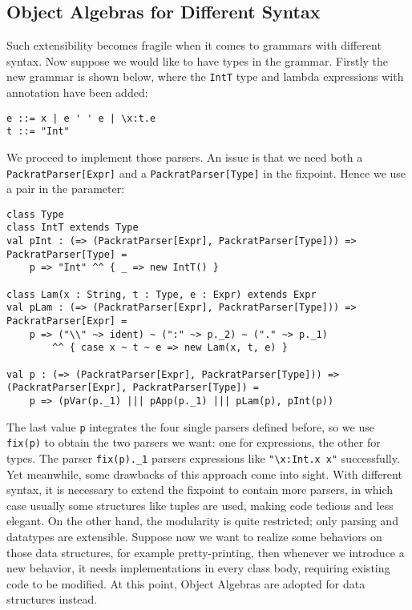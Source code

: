 \subsection{Object Algebras for Different Syntax}\label{subsec:differentsyntax}

Such extensibility becomes fragile when it comes to grammars with different syntax. Now suppose we would like to have types in the grammar. Firstly the new grammar is shown below, where the \lstinline{IntT} type and lambda expressions with annotation have been added:
\begin{lstlisting}
e ::= x | e ' ' e | \x:t.e
t ::= "Int"
\end{lstlisting}

We proceed to implement those parsers. An issue is that we need both a \lstinline{PackratParser[Expr]} and a \lstinline{PackratParser[Type]} in the fixpoint.
Hence we use a pair in the parameter:
\begin{lstlisting}
class Type
class IntT extends Type
val pInt : (=> (PackratParser[Expr], PackratParser[Type])) => PackratParser[Type] =
    p => "Int" ^^ { _ => new IntT() }

class Lam(x : String, t : Type, e : Expr) extends Expr
val pLam : (=> (PackratParser[Expr], PackratParser[Type])) => PackratParser[Expr] =
    p => ("\\" ~> ident) ~ (":" ~> p._2) ~ ("." ~> p._1)
        ^^ { case x ~ t ~ e => new Lam(x, t, e) }

val p : (=> (PackratParser[Expr], PackratParser[Type])) => (PackratParser[Expr], PackratParser[Type]) =
    p => (pVar(p._1) ||| pApp(p._1) ||| pLam(p), pInt(p))
\end{lstlisting}
The last value \lstinline{p} integrates the four single parsers defined before, so we use \lstinline{fix(p)} to
obtain the two parsers we want: one for expressions, the other for types. The parser \lstinline{fix(p)._1} parsers expressions
like \lstinline{"\x:Int.x x"} successfully. Yet meanwhile, some drawbacks of this approach come into sight. With different syntax, it
is necessary to extend the fixpoint to contain more parsers, in which case usually some structures like tuples are used,
making code tedious and less elegant. On the other hand, the modularity is quite restricted; only parsing and datatypes are extensible.
Suppose now we want to realize some behaviors on those data structures, for example pretty-printing, then whenever we introduce a new behavior,
it needs implementations in every class body, requiring existing code to be modified. At this point, Object Algebras are adopted for data structures
instead.


